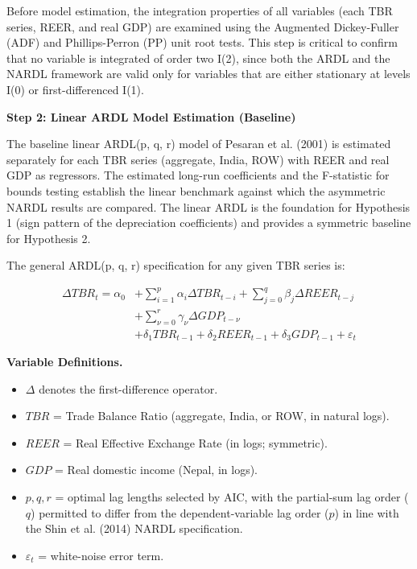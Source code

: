 \documentclass[12pt]{article}
\begin{document}
Before model estimation, the integration properties of all variables (each TBR series, REER, and real GDP) are examined using the Augmented Dickey-Fuller (ADF) and Phillips-Perron (PP) unit root tests. This step is critical to confirm that no variable is integrated of order two I(2), since both the ARDL and the NARDL framework are valid only for variables that are either stationary at levels I(0) or first-differenced I(1).

\vspace{0.5cm}
\noindent\textbf{Step 2: Linear ARDL Model Estimation (Baseline)}

The baseline linear ARDL(p, q, r) model of Pesaran et al. (2001) is estimated separately for each TBR series (aggregate, India, ROW) with REER and real GDP as regressors. The estimated long-run coefficients and the F-statistic for bounds testing establish the linear benchmark against which the asymmetric NARDL results are compared. The linear ARDL is the foundation for Hypothesis 1 (sign pattern of the depreciation coefficients) and provides a symmetric baseline for Hypothesis 2.

The general ARDL(p, q, r) specification for any given TBR series is:

\[
\begin{aligned}
\Delta TBR_t = \alpha_0 &+ \sum_{i=1}^{p} \alpha_i \Delta TBR_{t-i} + \sum_{j=0}^{q} \beta_j \Delta REER_{t-j} \\
&+ \sum_{\nu=0}^{r} \gamma_\nu \Delta GDP_{t-\nu} \\
&+ \delta_1 TBR_{t-1} + \delta_2 REER_{t-1} + \delta_3 GDP_{t-1} + \varepsilon_t
\end{aligned}
\tag{1}
\]

\noindent \textbf{Variable Definitions.}
\begin{itemize}
    \item $\Delta$ denotes the first-difference operator.
    \item $TBR$ = Trade Balance Ratio (aggregate, India, or ROW, in natural logs).
    \item $REER$ = Real Effective Exchange Rate (in logs; symmetric).
    \item $GDP$ = Real domestic income (Nepal, in logs).
    \item $p, q, r$ = optimal lag lengths selected by AIC, with the partial-sum lag order ($q$) permitted to differ from the dependent-variable lag order ($p$) in line with the Shin et al. (2014) NARDL specification.
    \item $\varepsilon_t$ = white-noise error term.
\end{itemize}
\end{document}
